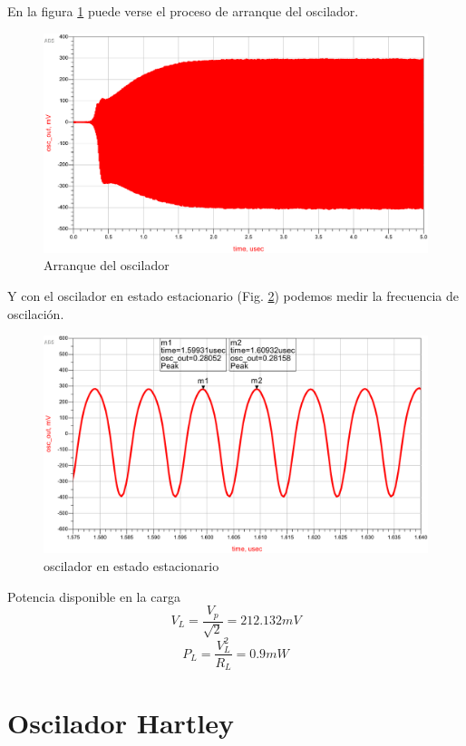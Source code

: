 \documentclass[journal]{IEEEtran}
\begin{document}
En la figura \ref{fig:clapp_osc_trans} puede verse el proceso de arranque del oscilador.

\begin{figure}[H]
\centering
\includegraphics[width=1\linewidth]{capturas/clapp_osc_trans-cropped.pdf}
\caption{Arranque del oscilador}
\label{fig:clapp_osc_trans}
\end{figure}

Y con el oscilador en estado estacionario (Fig. \ref{fig:clapp_osc_est}) podemos medir la frecuencia de oscilación.

\begin{figure}[H]
\centering
\includegraphics[width=1\linewidth]{capturas/clapp_osc_est-cropped.pdf}
\caption{oscilador en estado estacionario}
\label{fig:clapp_osc_est}
\end{figure}

Potencia disponible en la carga
$$V_L=\frac{V_p}{\sqrt{ 2 }}=212.132mV$$
$$P_L=\frac{V_L^2}{R_L}=0.9mW$$


\section{Oscilador Hartley}
\end{document}
